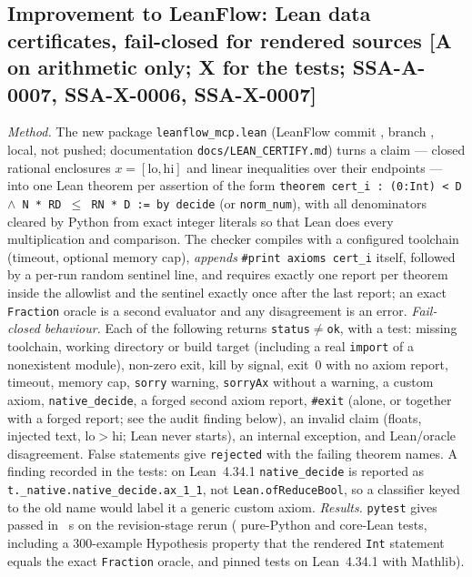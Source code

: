 \documentclass[10pt]{article}
\newcommand{\tier}[1]{\textsf{[#1]}}
\newcommand{\lean}[1]{\texttt{#1}}
\newcommand{\hash}[1]{\texttt{\expandafter\seqsplit\expandafter{#1}}}
\begin{document}
\subsection{Improvement to LeanFlow: Lean data certificates, fail-closed for rendered sources \tier{A on arithmetic only; X for the tests; SSA-A-0007, SSA-X-0006, SSA-X-0007}}\label{sec:lf}
\emph{Method.} The new package \texttt{leanflow\_mcp.lean} (LeanFlow commit \hash{\SSALFCommit}, branch \texttt{\SSALFBranch}, local, not pushed; documentation \texttt{docs/LEAN\_CERTIFY.md}) turns a claim --- closed rational enclosures $x=[\mathrm{lo},\mathrm{hi}]$ and linear inequalities over their endpoints --- into one Lean theorem per assertion of the form
\lean{theorem cert\_i : (0:Int) < D $\wedge$ N * RD $\le$ RN * D := by decide}
(or \lean{norm\_num}), with all denominators cleared by Python from exact integer literals so that Lean does every multiplication and comparison. The checker compiles with a configured toolchain (timeout, optional memory cap), \emph{appends} \lean{\#print axioms cert\_i} itself, followed by a per-run random sentinel line, and requires exactly one report per theorem inside the allowlist and the sentinel exactly once after the last report; an exact \lean{Fraction} oracle is a second evaluator and any disagreement is an error.
\emph{Fail-closed behaviour.} Each of the following returns \texttt{status}$\neq$\texttt{ok}, with a test: missing toolchain, working directory or build target (including a real \lean{import} of a nonexistent module), non-zero exit, kill by signal, exit~0 with no axiom report, timeout, memory cap, \lean{sorry} warning, \lean{sorryAx} without a warning, a custom axiom, \lean{native\_decide}, a forged second axiom report, \lean{\#exit} (alone, or together with a forged report; see the audit finding below), an invalid claim (floats, injected text, $\mathrm{lo}>\mathrm{hi}$; Lean never starts), an internal exception, and Lean/oracle disagreement. False statements give \texttt{rejected} with the failing theorem names. A finding recorded in the tests: on Lean~4.34.1 \lean{native\_decide} is reported as \lean{t.\_native.native\_decide.ax\_1\_1}, not \lean{Lean.ofReduceBool}, so a classifier keyed to the old name would label it a generic custom axiom.
\emph{Results.} \texttt{pytest} gives \SSALFPassed{} passed in \SSALFPytestTime~s on the revision-stage rerun (\SSALFNotPinned{} pure-Python and core-Lean tests, including a 300-example Hypothesis property that the rendered \lean{Int} statement equals the exact \lean{Fraction} oracle, and \SSALFPinnedLog{} pinned tests on Lean~4.34.1 with Mathlib).
\end{document}
